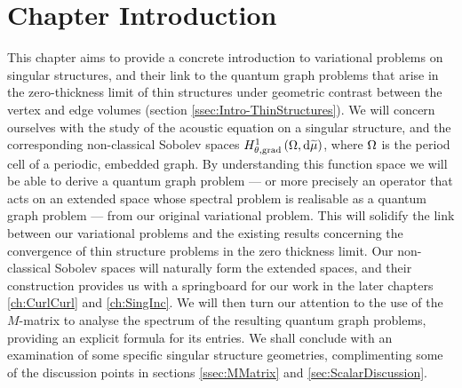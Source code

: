 \section{Chapter Introduction} \label{sec:ScalarEqnChapterIntro}
This chapter aims to provide a concrete introduction to variational problems on singular structures, and their link to the quantum graph problems that arise in the zero-thickness limit of thin structures under geometric contrast between the vertex and edge volumes (section \ref{ssec:Intro-ThinStructures}).
We will concern ourselves with the study of the acoustic equation on a singular structure, and the corresponding non-classical Sobolev spaces $H^1_{\theta, \mathrm{grad}}\left( \Omega, \mathrm{d}\widetilde{\mu} \right)$, where $\Omega$ is the period cell of a periodic, embedded graph.
By understanding this function space we will be able to derive a quantum graph problem --- or more precisely an operator that acts on an extended space whose spectral problem is realisable as a quantum graph problem --- from our original variational problem.
This will solidify the link between our variational problems and the existing results concerning the convergence of thin structure problems \cite{kuchment2001convergence, kuchment2003asymptotics, exner2005convergence, post2012spectral} in the zero thickness limit.
Our non-classical Sobolev spaces will naturally form the extended spaces, and their construction provides us with a springboard for our work in the later chapters \ref{ch:CurlCurl} and \ref{ch:SingInc}.
We will then turn our attention to the use of the $M$-matrix to analyse the spectrum of the resulting quantum graph problems, providing an explicit formula for its entries.
We shall conclude with an examination of some specific singular structure geometries, complimenting some of the discussion points in sections \ref{ssec:MMatrix} and \ref{sec:ScalarDiscussion}.

